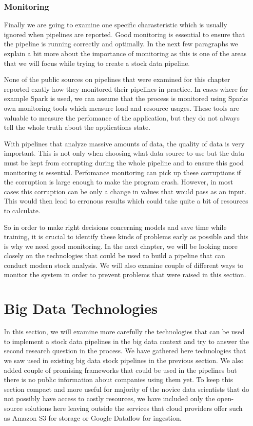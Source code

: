 \subsubsection{Monitoring}

Finally we are going to examine one specific charasteristic which is usually ignored when pipelines are reported.
Good monitoring is essential to ensure that the pipeline is running correctly and optimally.
In the next few paragraphs we explain a bit more about the importance of monitoring as this is one of the areas that we will focus while trying to create a stock data pipeline.

None of the public sources on pipelines that were examined for this chapter reported exatly how they monitored their pipelines in practice.
In cases where for example Spark is used, we can assume that the process is monitored using Sparks own monitoring tools which measure load and resource usages.
These tools are valuable to measure the perfomance of the application, but they do not always tell the whole truth about the applications state.

With pipelines that analyze massive amounts of data, the quality of data is very important.
This is not only when choosing what data source to use but the data must be kept from corrupting during the whole pipeline and to ensure this good monitoring is essential.
Perfomance monitoring can pick up these corruptions if the corruption is large enough to make the program crash.
However, in most cases this corruption can be only a change in values that would pass as an input.
This would then lead to erronous results which could take quite a bit of resources to calculate.

So in order to make right decisions concerning models and save time while training, it is crucial to identify these kinds of problems early as possible and this is why we need good monitoring.
In the next chapter, we will be looking more closely on the technologies that could be used to build a pipeline that can conduct modern stock analysis.
We will also examine couple of different ways to monitor the system in order to prevent problems that were raised in this section.



\section{Big Data Technologies}

In this section, we will examine more carefully the technologies that can be used to implement a stock data pipelines in the big data context and try to answer the second research question in the process.
We have gathered here technologies that we saw used in existing big data stock pipelines in the previous section.
We also added couple of promising frameworks that could be used in the pipelines but there is no public information about companies using them yet.
To keep this section compact and more useful for majority of the novice data scientists that do not possibly have access to costly resources, we have included only the open-source solutions here leaving outside the services that cloud providers offer such as Amazon S3 for storage or Google Dataflow for ingestion.

